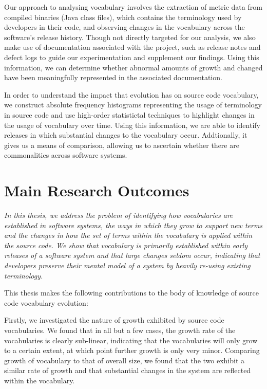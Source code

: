 Our approach to analysing vocabulary involves the extraction of metric data from compiled binaries (Java class files), which contains the terminology used by developers in their code, and observing changes in the vocabulary across the software's release history. Though not directly targeted for our analysis, we also make use of documentation associated with the project, such as release notes and defect logs to guide our experimentation and supplement our findings. Using this information, we can determine whether abnormal amounts of growth and changed have been meaningfully represented in the associated documentation.

In order to understand the impact that evolution has on source code vocabulary, we construct absolute frequency histograms representing the usage of terminology in source code and use high-order statistictal techniques to highlight changes in the usage of vocabulary over time. Using this information, we are able to identify releases in which substantial changes to the vocabulary occur. Addtionally, it gives us a means of comparison, allowing us to ascertain whether there are commonalities across software systems.


\section{Main Research Outcomes} %
\label{sec:main_research_outcomes}

\emph{In this thesis, we address the problem of identifying how vocabularies are established in software systems, the ways in which they grow to support new terms and the changes in how the set of terms within the vocabulary is applied within the source code. We show that vocabulary is primarily established within early releases of a software system and that large changes seldom occur, indicating that developers preserve their mental model of a system by heavily re-using existing terminology. }

This thesis makes the following contributions to the body of knowledge of source code vocabulary evolution:

Firstly, we investigated the nature of growth exhibited by source code vocabularies. We found that in all but a few cases, the growth rate of the vocabularies is clearly sub-linear, indicating that the vocabularies will only grow to a certain extent, at which point further growth is only very minor. Comparing growth of vocabulary to that of overall size, we found that the two exhibit a similar rate of growth and that substantial changes in the system are reflected within the vocabulary.


